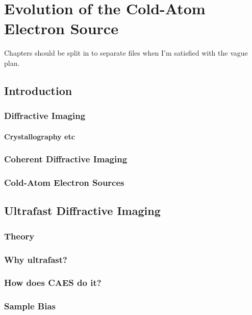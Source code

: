 \part{Evolution of the Cold-Atom Electron Source}

Chapters should be split in to separate files when I'm satisfied with the vague plan.

\chapter{Introduction}

\section{Diffractive Imaging}

\subsection{Crystallography etc}

\section{Coherent Diffractive Imaging}

\section{Cold-Atom Electron Sources}





\chapter{Ultrafast Diffractive Imaging}

\section{Theory}

\section{Why ultrafast?}

\section{How does CAES do it?}

\section{Sample Bias}\label{section:sample_bias}


